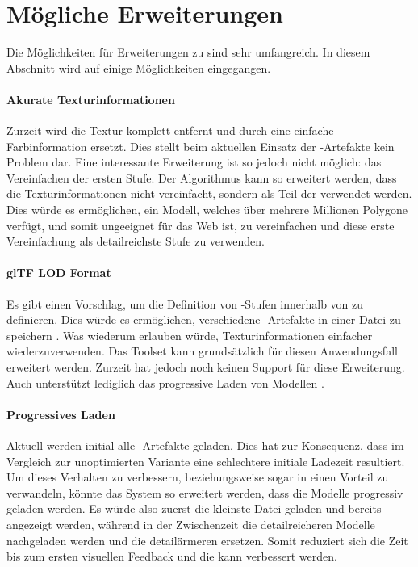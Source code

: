 \section{Mögliche Erweiterungen}
Die Möglichkeiten für Erweiterungen zu  sind sehr umfangreich. In diesem Abschnitt wird auf einige Möglichkeiten eingegangen.

\paragraph{Akurate Texturinformationen}
Zurzeit wird die Textur komplett entfernt und durch eine einfache Farbinformation ersetzt. Dies stellt beim aktuellen Einsatz der -Artefakte kein Problem dar. Eine interessante Erweiterung ist so jedoch nicht möglich: das Vereinfachen der ersten Stufe. Der Algorithmus kann so erweitert werden, dass die Texturinformationen nicht vereinfacht, sondern als Teil der  verwendet werden. Dies würde es ermöglichen, ein Modell, welches über mehrere Millionen Polygone verfügt, und somit ungeeignet für das Web ist, zu vereinfachen und diese erste Vereinfachung als detailreichste Stufe zu verwenden.

\paragraph{glTF LOD Format}
Es gibt einen Vorschlag, um die Definition von -Stufen innerhalb von  zu definieren. Dies würde es ermöglichen, verschiedene -Artefakte in einer Datei zu speichern \cite{glTFExtensionLOD}. Was wiederum erlauben würde, Texturinformationen einfacher wiederzuverwenden. Das Toolset kann grundsätzlich für diesen Anwendungsfall erweitert werden.
Zurzeit hat  jedoch noch keinen Support für diese Erweiterung. Auch  unterstützt lediglich das progressive Laden von Modellen \cite{babylonProgressiveLoading}.

\paragraph{Progressives Laden}
Aktuell werden initial alle -Artefakte geladen. Dies hat zur Konsequenz, dass im Vergleich zur unoptimierten Variante eine schlechtere initiale Ladezeit resultiert. Um dieses Verhalten zu verbessern, beziehungsweise sogar in einen Vorteil zu verwandeln, könnte das System so erweitert werden, dass die Modelle progressiv geladen werden. Es würde also zuerst die kleinste Datei geladen und bereits angezeigt werden, während in der Zwischenzeit die detailreicheren Modelle nachgeladen werden und die detailärmeren ersetzen. Somit reduziert sich die Zeit bis zum ersten visuellen Feedback und die  kann verbessert werden.

